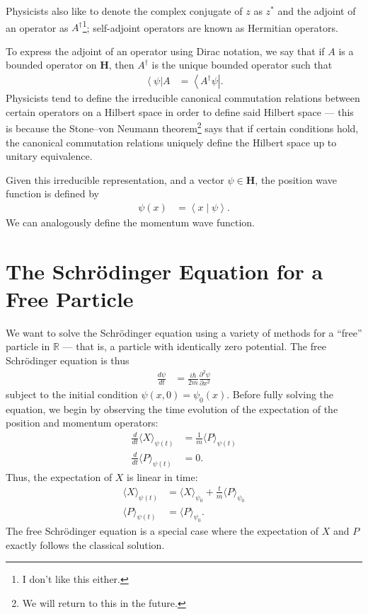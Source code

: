 \documentclass[10pt]{extarticle}
\newcommand{\R}{\mathbb{R}}
\newcommand{\bra}[1]{\left\langle#1\right\vert}
\newcommand{\braket}[2]{\left\langle#1\mid#2\right\rangle}
\theoremstyle{plain}
\theoremstyle{definition}
\theoremstyle{remark}
\renewcommand{\newline}{\hfill\break}
\begin{document}
  Physicists also like to denote the complex conjugate of $z$ as $z^{\ast}$ and the adjoint of an operator as $A^{\dagger}$\footnote{I don't like this either.}; self-adjoint operators are known as Hermitian operators.\newline

  To express the adjoint of an operator using Dirac notation, we say that if $A$ is a bounded operator on $\mathbf{H}$, then $A^{\dagger}$ is the unique bounded operator such that
  \begin{align*}
    \bra{\psi}A &= \bra{A^{\dagger}\psi}.
  \end{align*}
  Physicists tend to define the irreducible canonical commutation relations between certain operators on a Hilbert space in order to define said Hilbert space --- this is because the Stone--von Neumann theorem\footnote{We will return to this in the future.} says that if certain conditions hold, the canonical commutation relations uniquely define the Hilbert space up to unitary equivalence.\newline

  Given this irreducible representation, and a vector $\psi \in \mathbf{H}$, the position wave function is defined by
  \begin{align*}
    \psi(x) &= \braket{x}{\psi}.
  \end{align*}
  We can analogously define the momentum wave function.
  \section{The Schrödinger Equation for a Free Particle}%
  We want to solve the Schrödinger equation using a variety of methods for a ``free'' particle in $\R$ --- that is, a particle with identically zero potential. The free Schrödinger equation is thus
  \begin{align*}
    \frac{d\psi}{dt} &= \frac{i\hbar}{2m}\frac{\partial^2\psi}{\partial x^2}
  \end{align*}
  subject to the initial condition $\psi(x,0) = \psi_0(x)$. Before fully solving the equation, we begin by observing the time evolution of the expectation of the position and momentum operators:
  \begin{align*}
    \frac{d}{dt}\langle X \rangle_{\psi(t)} &= \frac{1}{m}\langle P \rangle_{\psi(t)}\\
    \frac{d}{dt}\langle P \rangle_{\psi(t)} &= 0.
  \end{align*}
  Thus, the expectation of $X$ is linear in time:
  \begin{align*}
    \langle X \rangle_{\psi(t)} &= \langle X \rangle_{\psi_0} + \frac{t}{m}\langle P \rangle_{\psi_0}\\
    \langle P \rangle_{\psi(t)} &= \langle P \rangle_{\psi_0}.
  \end{align*}
  The free Schrödinger equation is a special case where the expectation of $X$ and $P$ exactly follows the classical solution.
\end{document}
